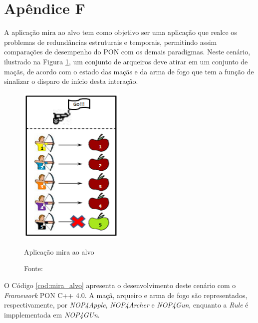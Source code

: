 


\chapter*{Apêndice F}\label{ap:apendice_mira_alvo}

A aplicação mira ao alvo tem como objetivo ser uma aplicação que realce os
problemas de redundâncias estruturais e temporais, permitindo assim comparações
de desempenho do PON com os demais paradigmas. Neste cenário, ilustrado na
Figura \ref{fig:mira_alvo}, um conjunto de arqueiros deve atirar em um conjunto
de maçãs, de acordo com o estado das maçãs e da arma de fogo que tem a função de
sinalizar o disparo de início desta interação.

\begin{figure}[!htb]
\centering
\includegraphics[width=0.45\textwidth]{../figures/mira_alvo_2.PNG}
\smallskip
\caption{Aplicação mira ao alvo}
\caption*{Fonte: }
\label{fig:mira_alvo}
\end{figure}

O Código \ref{cod:mira_alvo} apresenta o desenvolvimento deste cenário com o
\textit{Framework} PON C++ 4.0. A maçã, arqueiro e arma de fogo são
representados, respectivamente, por \textit{NOP4Apple}, \textit{NOP4Archer} e
\textit{NOP4Gun}, enquanto a \textit{Rule} é impplementada em \textit{NOP4GUn}.
  
